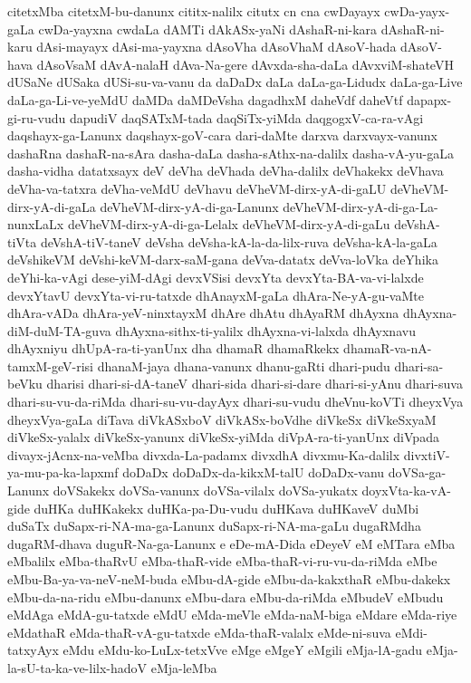 {citetxMba
citetxM-bu-danunx
cititx-nalilx
citutx
cn
cna
cwDayayx
cwDa-yayx-gaLa
cwDa-yayxna
cwdaLa
dAMTi
dAkASx-yaNi
dAshaR-ni-kara
dAshaR-ni-karu
dAsi-mayayx
dAsi-ma-yayxna
dAsoVha
dAsoVhaM
dAsoV-hada
dAsoV-hava
dAsoVsaM
dAvA-nalaH
dAva-Na-gere
dAvxda-sha-daLa
dAvxviM-shateVH
dUSaNe
dUSaka
dUSi-su-va-vanu
da
daDaDx
daLa
daLa-ga-Lidudx
daLa-ga-Live
daLa-ga-Li-ve-yeMdU
daMDa
daMDeVsha
dagadhxM
daheVdf
daheVtf
dapapx-gi-ru-vudu
dapudiV
daqSATxM-tada
daqSiTx-yiMda
daqgogxV-ca-ra-vAgi
daqshayx-ga-Lanunx
daqshayx-goV-cara
dari-daMte
darxva
darxvayx-vanunx
dashaRna
dashaR-na-sAra
dasha-daLa
dasha-sAthx-na-dalilx
dasha-vA-yu-gaLa
dasha-vidha
datatxsayx
deV
deVha
deVhada
deVha-dalilx
deVhakekx
deVhava
deVha-va-tatxra
deVha-veMdU
deVhavu
deVheVM-dirx-yA-di-gaLU
deVheVM-dirx-yA-di-gaLa
deVheVM-dirx-yA-di-ga-Lanunx
deVheVM-dirx-yA-di-ga-La-nunxLaLx
deVheVM-dirx-yA-di-ga-Lelalx
deVheVM-dirx-yA-di-gaLu
deVshA-tiVta
deVshA-tiV-taneV
deVsha
deVsha-kA-la-da-lilx-ruva
deVsha-kA-la-gaLa
deVshikeVM
deVshi-keVM-darx-saM-gana
deVva-datatx
deVva-loVka
deYhika
deYhi-ka-vAgi
dese-yiM-dAgi
devxVSisi
devxYta
devxYta-BA-va-vi-lalxde
devxYtavU
devxYta-vi-ru-tatxde
dhAnayxM-gaLa
dhAra-Ne-yA-gu-vaMte
dhAra-vADa
dhAra-yeV-ninxtayxM
dhAre
dhAtu
dhAyaRM
dhAyxna
dhAyxna-diM-duM-TA-guva
dhAyxna-sithx-ti-yalilx
dhAyxna-vi-lalxda
dhAyxnavu
dhAyxniyu
dhUpA-ra-ti-yanUnx
dha
dhamaR
dhamaRkekx
dhamaR-va-nA-tamxM-geV-risi
dhanaM-jaya
dhana-vanunx
dhanu-gaRti
dhari-pudu
dhari-sa-beVku
dharisi
dhari-si-dA-taneV
dhari-sida
dhari-si-dare
dhari-si-yAnu
dhari-suva
dhari-su-vu-da-riMda
dhari-su-vu-dayAyx
dhari-su-vudu
dheVnu-koVTi
dheyxVya
dheyxVya-gaLa
diTava
diVkASxboV
diVkASx-boVdhe
diVkeSx
diVkeSxyaM
diVkeSx-yalalx
diVkeSx-yanunx
diVkeSx-yiMda
diVpA-ra-ti-yanUnx
diVpada
divayx-jAcnx-na-veMba
divxda-La-padamx
divxdhA
divxmu-Ka-dalilx
divxtiV-ya-mu-pa-ka-lapxmf
doDaDx
doDaDx-da-kikxM-talU
doDaDx-vanu
doVSa-ga-Lanunx
doVSakekx
doVSa-vanunx
doVSa-vilalx
doVSa-yukatx
doyxVta-ka-vA-gide
duHKa
duHKakekx
duHKa-pa-Du-vudu
duHKava
duHKaveV
duMbi
duSaTx
duSapx-ri-NA-ma-ga-Lanunx
duSapx-ri-NA-ma-gaLu
dugaRMdha
dugaRM-dhava
duguR-Na-ga-Lanunx
e
eDe-mA-Dida
eDeyeV
eM
eMTara
eMba
eMbalilx
eMba-thaRvU
eMba-thaR-vide
eMba-thaR-vi-ru-vu-da-riMda
eMbe
eMbu-Ba-ya-va-neV-neM-buda
eMbu-dA-gide
eMbu-da-kakxthaR
eMbu-dakekx
eMbu-da-na-ridu
eMbu-danunx
eMbu-dara
eMbu-da-riMda
eMbudeV
eMbudu
eMdAga
eMdA-gu-tatxde
eMdU
eMda-meVle
eMda-naM-biga
eMdare
eMda-riye
eMdathaR
eMda-thaR-vA-gu-tatxde
eMda-thaR-valalx
eMde-ni-suva
eMdi-tatxyAyx
eMdu
eMdu-ko-LuLx-tetxVve
eMge
eMgeY
eMgili
eMja-lA-gadu
eMja-la-sU-ta-ka-ve-lilx-hadoV
eMja-leMba
}
